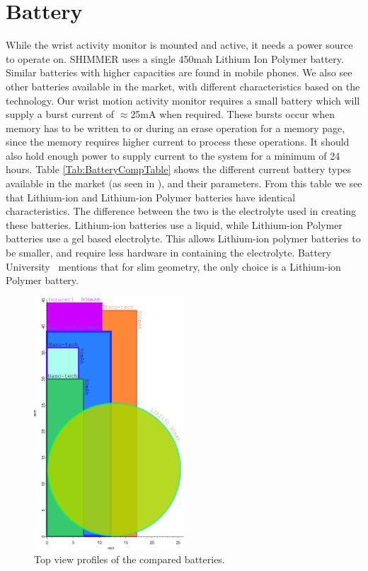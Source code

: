 \section{Battery}
\label{Sec:Battery}

While the wrist activity monitor is mounted and active, it needs a power source to operate on.
SHIMMER \cite{Web:ShimmerHome} uses a single 450mah Lithium Ion Polymer battery.
Similar batteries with higher capacities are found in mobile phones. We also see other batteries available in the market,
with different characteristics based on the technology.
Our wrist motion activity monitor requires a small battery which will supply a burst current of $\approx$25mA when required.
These bursts occur when memory has to be written to or during an erase operation for a memory page,
since the memory requires higher current to process these operations.
It should also hold enough power to supply current to the system for a minimum of 24 hours.
Table \ref{Tab:BatteryCompTable} shows the different current battery types available in the market (as seen in \cite{Web:BatteryTable}), and their parameters. From this table we see that Lithium-ion and Lithium-ion Polymer batteries have identical characteristics.
The difference between the two is the electrolyte used in creating these batteries.
Lithium-ion batteries use a liquid,
while Lithium-ion Polymer batteries use a gel based electrolyte.
This allows Lithium-ion polymer batteries to be smaller,
and require less hardware in containing the electrolyte.
Battery University~\cite{Web:BatteryTable} mentions that for slim geometry, the only choice is a Lithium-ion Polymer battery.
\begin{figure}
\begin{center}
\includegraphics[width=0.5\textwidth]{images/battcompare.eps}
\caption{Top view profiles of the compared batteries.}
\label{Fig:BattComp}
\end{center}
\end{figure}
